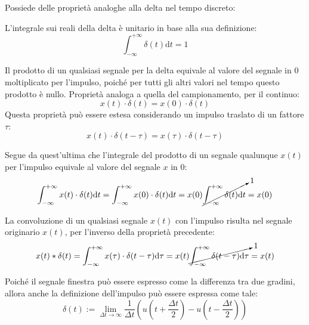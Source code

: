 \documentclass{article}
\newcommand{\df}{\mathrm{d}}
\numberwithin{equation}{subsection}
\begin{document}
Possiede delle proprietà analoghe alla delta nel tempo discreto:



L'integrale sui reali della delta è unitario in base alla sua definizione:
\begin{equation*}
    \displaystyle\int_{-\infty}^{+\infty}\delta(t)\df t=1
\end{equation*}



Il prodotto di un qualsiasi segnale per la delta equivale al valore del segnale in $0$ moltiplicato per l'impulso, poiché per tutti gli altri valori nel tempo questo prodotto 
è nullo. Proprietà analoga a quella del campionamento, per il continuo:
\begin{equation*}
    x(t)\cdot\delta(t)=x(0)\cdot\delta(t)
\end{equation*}
Questa proprietà può essere estesa considerando un impulso traslato di un fattore $\tau$:
\begin{equation*}
    x(t)\cdot\delta(t-\tau)=x(\tau)\cdot\delta(t-\tau)
\end{equation*}



Segue da quest'ultima che l'integrale del prodotto di un segnale qualunque $x(t)$ per l'impulso equivale al valore del segnale $x$ in $0$:
\begin{equation*}
    \displaystyle\int_{-\infty}^{+\infty}x(t)\cdot\delta(t)\df t=\int_{-\infty}^{+\infty}x(0)\cdot\delta(t)\df t=x(0)\cancelto{1}{\int_{-\infty}^{+\infty}\delta(t)\df t}=x(0)
\end{equation*}



La convoluzione di un qualsiasi segnale $x(t)$ con l'impulso risulta nel segnale originario $x(t)$, per l'inverso della proprietà precedente: 
\begin{equation*}
    x(t)*\delta(t)=\displaystyle\int_{-\infty}^{+\infty}x(\tau)\cdot\delta(t-\tau)\df\tau=x(t)\cancelto{1}{\int_{-\infty}^{+\infty}\delta(t-\tau)\df\tau}=x(t)
\end{equation*}



Poiché il segnale finestra può essere espresso come la differenza tra due gradini, allora anche la definizione dell'impulso può essere espressa come tale:
\begin{equation*}
    \delta(t):=\lim_{\Delta t\to\infty}\frac{1}{\Delta t}\left(u\left(t+\frac{\Delta t}{2}\right)-u\left(t-\frac{\Delta t}{2}\right)\right)
\end{equation*}
\end{document}
